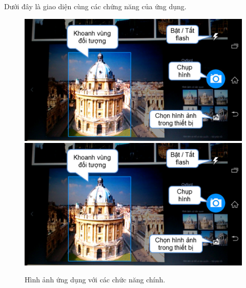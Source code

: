 {Dưới đây là giao diện cùng các chứng năng của ứng dụng.

\begin{figure}[!htbp]
  \begin{center}
    \leavevmode
    \ifpdf
      \includegraphics[scale=0.17]{interface_1}
    \else
      \includegraphics[scale=0.17]{interface_1}
    \fi
    \caption[Hình ảnh giao diện ứng dụng với các chức năng chính. Ứng dụng cho phép người dùng chọn vùng đối tượng trên camera, chụp hình vùng đối tượng, bật / tắt đèn flash và chọn hình ảnh trong thiết bị để truy vấn]{Hình ảnh ứng dụng với các chức năng chính.}
    \label{FigChooseRegion}
  \end{center}
\end{figure}

}
